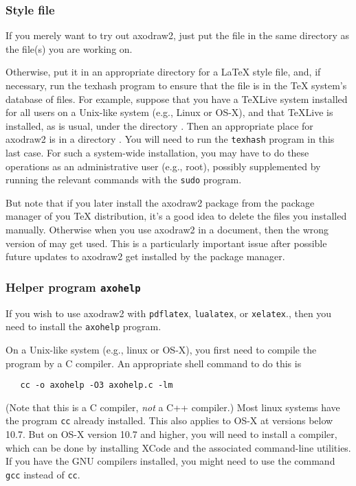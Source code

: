 \documentclass[12pt]{article}
\def\program#1{\texttt{#1}}
\begin{document}
\subsubsection{Style file \texorpdfstring{\protect{}}{axodraw2.sty}}

If you merely want to try out axodraw2, just put the file
 in the same directory as the 
file(s) you are working on. 

Otherwise, put it in an appropriate directory for a \LaTeX{} style
file, and, if necessary, run the texhash program to ensure that the
file is in the \TeX{} system's database of files.  For example,
suppose that you have a TeXLive system installed for all users on a
Unix-like system (e.g., Linux or OS-X), and that TeXLive is installed,
as is usual, under the directory .  Then an
appropriate place for axodraw2 is in a directory
.  You will
need to run the \program{texhash} program in this last case.  For such
a system-wide installation, you may have to do these
operations as an administrative user (e.g., root), possibly
supplemented by running the relevant commands with the \program{sudo}
program.

But note that if you later install the axodraw2 package from the
package manager of you \TeX{} distribution, it's a good idea to delete
the files you installed manually.  Otherwise when you use axodraw2 in
a document, then the wrong version of  may get
used.  This is a particularly important issue after possible future
updates to axodraw2 get installed by the package manager.

\subsubsection{Helper program \program{axohelp}}
\label{sec:axohelp}

If you wish to use axodraw2 with \program{pdflatex}, \program{lualatex},
or \program{xelatex}., then you need to install the \program{axohelp}
program.

On a Unix-like system (e.g., linux or OS-X), you first need to compile
the program by a C compiler.  An appropriate shell command to do this
is
\begin{verbatim}
   cc -o axohelp -O3 axohelp.c -lm
\end{verbatim}
(Note that this is a C compiler, \emph{not} a C++ compiler.)  Most linux
systems have the program \program{cc} already installed.  This also applies to
OS-X at versions below 10.7.  But on OS-X version 10.7 and higher, you
will need to install a compiler, which can be done by installing XCode
and the associated command-line utilities.  If you have the GNU
compilers installed, you might need to use the command \program{gcc}
instead of \program{cc}.
\end{document}
